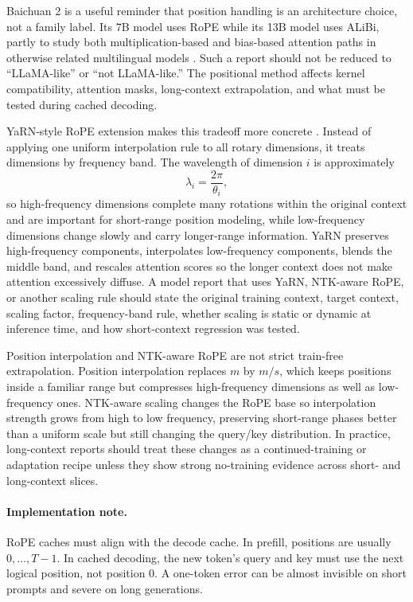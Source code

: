 Baichuan 2 is a useful reminder that position handling is an architecture choice, not a family label. Its 7B model uses RoPE while its 13B model uses ALiBi, partly to study both multiplication-based and bias-based attention paths in otherwise related multilingual models \cite{yang2023baichuan2}. Such a report should not be reduced to ``LLaMA-like'' or ``not LLaMA-like.'' The positional method affects kernel compatibility, attention masks, long-context extrapolation, and what must be tested during cached decoding.

YaRN-style RoPE extension makes this tradeoff more concrete \cite{peng2023yarn}. Instead of applying one uniform interpolation rule to all rotary dimensions, it treats dimensions by frequency band. The wavelength of dimension $i$ is approximately
\begin{equation}
  \lambda_i = \frac{2\pi}{\theta_i},
\end{equation}
so high-frequency dimensions complete many rotations within the original context and are important for short-range position modeling, while low-frequency dimensions change slowly and carry longer-range information. YaRN preserves high-frequency components, interpolates low-frequency components, blends the middle band, and rescales attention scores so the longer context does not make attention excessively diffuse. A model report that uses YaRN, NTK-aware RoPE, or another scaling rule should state the original training context, target context, scaling factor, frequency-band rule, whether scaling is static or dynamic at inference time, and how short-context regression was tested.

Position interpolation and NTK-aware RoPE are not strict train-free extrapolation. Position interpolation replaces $m$ by $m/s$, which keeps positions inside a familiar range but compresses high-frequency dimensions as well as low-frequency ones. NTK-aware scaling changes the RoPE base so interpolation strength grows from high to low frequency, preserving short-range phases better than a uniform scale but still changing the query/key distribution. In practice, long-context reports should treat these changes as a continued-training or adaptation recipe unless they show strong no-training evidence across short- and long-context slices.

\paragraph{Implementation note.}
RoPE caches must align with the decode cache. In prefill, positions are usually $0,\ldots,T-1$. In cached decoding, the new token's query and key must use the next logical position, not position 0. A one-token error can be almost invisible on short prompts and severe on long generations.

